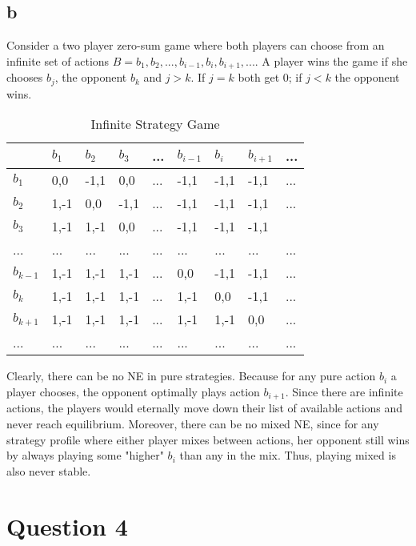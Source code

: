 \documentclass[10pt,a4paper]{article}
\begin{document}
\subsection*{b}
Consider a two player zero-sum game where both players can choose from an infinite set of actions $B={b_1,b_2,...,b_{i-1},b_i,b_{i+1},...}$. A player wins the game if she chooses $b_j$, the opponent $b_k$ and $j>k$. If $j=k$ both get $0$; if $j<k$ the opponent wins. 

\begin{table}[h]
\centering
\caption{Infinite Strategy Game}
\begin{tabular}{|l|l|l|l|l|l|l|l|l|}
\hline
          & $b_1$ & $b_2$ & $b_3$ & ... & $b_{i-1}$ & $b_{i}$ & $b_{i+1}$ & ... \\ \hline
$b_1$     & 0,0   & -1,1  & 0,0   & ... & -1,1       & -1,1     & -1,1       & ... \\ \hline
$b_2$     & 1,-1  & 0,0   & -1,1  & ... & -1,1       & -1,1     & -1,1      & ... \\ \hline
$b_3$     & 1,-1   & 1,-1  & 0,0   & ... & -1,1       & -1,1     & -1,1       &     \\ \hline
...       & ...   & ...   & ...   & ... & ...       & ...     & ...       & ... \\ \hline
$b_{k-1}$ & 1,-1   & 1,-1   & 1,-1   & ... & 0,0       & -1,1    & -1,1       & ... \\ \hline
$b_{k}$   & 1,-1   & 1,-1   & 1,-1   & ... & 1,-1      & 0,0     & -1,1      & ... \\ \hline
$b_{k+1}$ & 1,-1   & 1,-1   & 1,-1   & ... & 1,-1       & 1,-1    & 0,0       & ... \\ \hline
...       & ...   & ...   & ...   & ... & ...       & ...     & ...       & ... \\ \hline
\end{tabular}
\end{table}

Clearly, there can be no NE in pure strategies. Because for any pure action $b_i$ a player chooses, the opponent optimally plays action $b_{i+1}$. Since there are infinite actions, the players would eternally move down their list of available actions and never reach equilibrium. Moreover, there can be no mixed NE, since for any strategy profile where either player mixes between actions, her opponent still wins by always playing some "higher" $b_i$ than any in the mix. Thus, playing mixed is also never stable.

\section*{Question 4}
\end{document}
